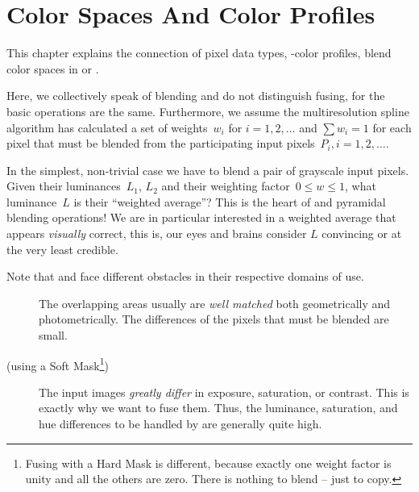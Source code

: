 

\chapter[Color Spaces\commonpart]{Color Spaces And Color Profiles\commonpart
  \label{sec:color-spaces}
  }

This chapter explains the connection of pixel data types,
-color
profiles,%
 blend color
spaces in  or .

Here, we collectively speak of blending%
 and do not distinguish
fusing,
for the basic operations are the same.  Furthermore, we assume the
multiresolution spline algorithm has calculated a set of weights~$w_i$
for $i = 1, 2, \dots$ and $\sum w_i = 1$ for each pixel that must be
blended from the participating input pixels~$P_i, i = 1, 2, \dots$.

In the simplest, non-trivial case we have to blend a pair of grayscale
input pixels.  Given their luminances~$L_1$, $L_2$ and their weighting
factor~$0 \leq w \leq 1$, what
luminance~$L$ is their ``weighted average''?  This
is the heart of  and 
pyramidal blending operations!  We are in particular interested in a
weighted average that appears \emph{visually} correct, this is, our
eyes and brains consider $L$ convincing or at the very least credible.

\begin{geeknote}
  \noindent Note that  and 
  face different obstacles in their respective domains of use.

  \begin{description}
  \item[]\itemend The overlapping areas usually
    are \emph{well matched} both geometrically and photometrically.
    The differences of the pixels that must be blended are small.

  \item[ (using a Soft Mask\footnote{Fusing with a
      Hard Mask is different, because exactly one weight factor is
      unity and all the others are zero.  There is nothing to blend --
      just to copy.})]\itemend The input images \emph{greatly differ}
    in exposure, saturation, or contrast.  This is exactly why we want
    to fuse them.  Thus, the luminance, saturation, and hue
    differences to be handled by  are generally
    quite high.
  \end{description}
\end{geeknote}

